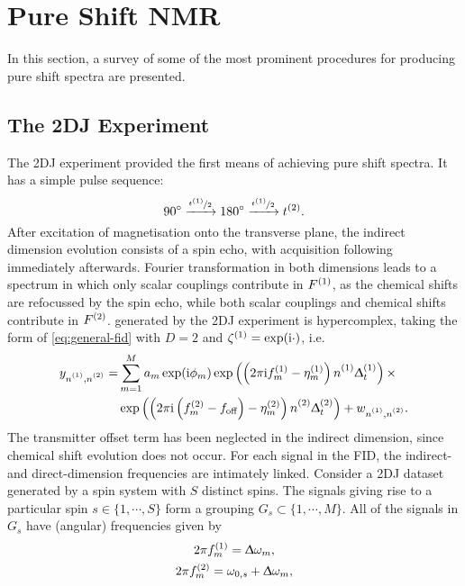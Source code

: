 \section{Pure Shift NMR}

In this section, a survey of some of the most prominent procedures for
producing pure shift spectra are presented.

\subsection{The \acl{2DJ} Experiment}
The \ac{2DJ} experiment\cite{Aue1976, Morris2009} provided the first means of
achieving pure shift spectra. It has a simple pulse sequence:
\[
    \ang{90} \xrightarrow{\nicefrac{t^{(1)}}{2}} \ang{180} \xrightarrow{\nicefrac{t^{(1)}}{2}} t^{(2)}.
\]
After excitation of magnetisation onto the transverse plane, the indirect
dimension evolution consists of a spin echo, with acquisition following
immediately afterwards. Fourier transformation in both dimensions leads to a
spectrum in which only scalar couplings contribute in $F^{(1)}$, as the chemical
shifts are refocussed by the spin echo, while both scalar couplings and
chemical shifts contribute in $F^{(2)}$.   generated by the \ac{2DJ}
experiment is hypercomplex, taking the form of \eqref{eq:general-fid} with
$D=2$ and $\zeta^{(1)} = \exp(\mathrm{i}\cdot)$, i.e.
\begin{equation}%
    \begin{split}%
        y_{\none,\ntwo} =
        &\sum_{m=1}^{M} a_m \exp(\iu \phi_m)
            \exp\left(\left(2 \pi \iu \fonem - \etaonem\right) \none \Dtone\right) \times \\
        &\exp\left(\left(2 \pi \iu  \left(\ftwom - \foff\right)
            - \etatwom\right) \ntwo \Dttwo\right)
            + w_{\none,\ntwo}.
    \end{split}%
    \label{eq:jres-fid}
\end{equation}%
The transmitter offset term has been neglected in the indirect dimension, since
chemical shift evolution does not occur.
For each signal in the \ac{FID}, the indirect- and direct-dimension
frequencies are intimately linked. Consider a \ac{2DJ} dataset generated by a
spin system with $S$ distinct spins. The signals giving rise to a particular
spin $s \in \lbrace 1, \cdots, S \rbrace$ form a grouping $G_s
\subset \lbrace 1, \cdots, M \rbrace$. All of the signals in $G_s$
have (angular) frequencies given by
\begin{subequations}
    \begin{gather}
        2 \pi f_m^{(1)} = \Updelta \omega_m,\\
        2 \pi f_m^{(2)} = \omega_{0,s} + \Updelta \omega_m,
    \end{gather}
    \label{eq:f1-f2-2dj}
\end{subequations}

